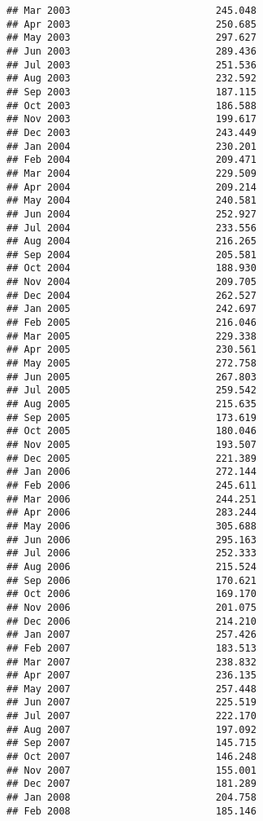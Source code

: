 \documentclass[
]{article}
\begin{document}
\begin{verbatim}
## Mar 2003                         245.048
## Apr 2003                         250.685
## May 2003                         297.627
## Jun 2003                         289.436
## Jul 2003                         251.536
## Aug 2003                         232.592
## Sep 2003                         187.115
## Oct 2003                         186.588
## Nov 2003                         199.617
## Dec 2003                         243.449
## Jan 2004                         230.201
## Feb 2004                         209.471
## Mar 2004                         229.509
## Apr 2004                         209.214
## May 2004                         240.581
## Jun 2004                         252.927
## Jul 2004                         233.556
## Aug 2004                         216.265
## Sep 2004                         205.581
## Oct 2004                         188.930
## Nov 2004                         209.705
## Dec 2004                         262.527
## Jan 2005                         242.697
## Feb 2005                         216.046
## Mar 2005                         229.338
## Apr 2005                         230.561
## May 2005                         272.758
## Jun 2005                         267.803
## Jul 2005                         259.542
## Aug 2005                         215.635
## Sep 2005                         173.619
## Oct 2005                         180.046
## Nov 2005                         193.507
## Dec 2005                         221.389
## Jan 2006                         272.144
## Feb 2006                         245.611
## Mar 2006                         244.251
## Apr 2006                         283.244
## May 2006                         305.688
## Jun 2006                         295.163
## Jul 2006                         252.333
## Aug 2006                         215.524
## Sep 2006                         170.621
## Oct 2006                         169.170
## Nov 2006                         201.075
## Dec 2006                         214.210
## Jan 2007                         257.426
## Feb 2007                         183.513
## Mar 2007                         238.832
## Apr 2007                         236.135
## May 2007                         257.448
## Jun 2007                         225.519
## Jul 2007                         222.170
## Aug 2007                         197.092
## Sep 2007                         145.715
## Oct 2007                         146.248
## Nov 2007                         155.001
## Dec 2007                         181.289
## Jan 2008                         204.758
## Feb 2008                         185.146

\end{verbatim}
\end{document}
